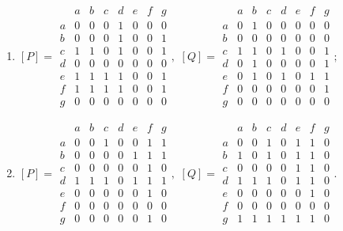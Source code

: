 \begin{enumerate}
\begin{enumerate}
        \item 
        \(
            [P]=
            \begin{array}{c|ccccccc}
                 &a&b&c&d&e&f&g\\ \hline
                a&0&0&0&1&0&0&0\\
                b&0&0&0&1&0&0&1\\
                c&1&1&0&1&0&0&1\\
                d&0&0&0&0&0&0&0\\
                e&1&1&1&1&0&0&1\\
                f&1&1&1&1&0&0&1\\
                g&0&0&0&0&0&0&0
            \end{array},
        \)
        \(
            [Q]=
            \begin{array}{c|ccccccc}
                 &a&b&c&d&e&f&g\\ \hline
                a&0&1&0&0&0&0&0\\
                b&0&0&0&0&0&0&0\\
                c&1&1&0&1&0&0&1\\
                d&0&1&0&0&0&0&1\\
                e&0&1&0&1&0&1&1\\
                f&0&0&0&0&0&0&1\\
                g&0&0&0&0&0&0&0
            \end{array};
        \)
        
        \item 
        \(
            [P]=
            \begin{array}{c|ccccccc}
                 &a&b&c&d&e&f&g\\ \hline
                a&0&0&1&0&0&1&1\\
                b&0&0&0&0&1&1&1\\
                c&0&0&0&0&0&1&0\\
                d&1&1&1&0&1&1&1\\
                e&0&0&0&0&0&1&0\\
                f&0&0&0&0&0&0&0\\
                g&0&0&0&0&0&1&0
            \end{array},
        \)
        \(
            [Q]=
            \begin{array}{c|ccccccc}
                 &a&b&c&d&e&f&g\\ \hline
                a&0&0&1&0&1&1&0\\
                b&1&0&1&0&1&1&0\\
                c&0&0&0&0&1&1&0\\
                d&1&1&1&0&1&1&0\\
                e&0&0&0&0&0&1&0\\
                f&0&0&0&0&0&0&0\\
                g&1&1&1&1&1&1&0
            \end{array}.
        \)
    \end{enumerate}


\end{enumerate}
